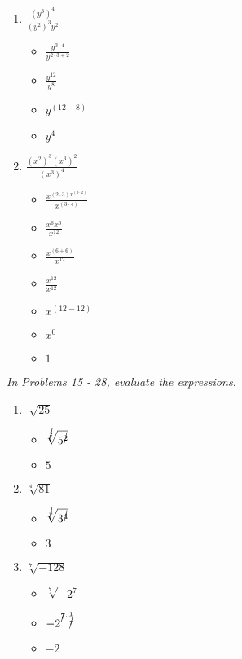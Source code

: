 \documentclass{article}
\begin{document}
\begin{onehalfspace}
\begin{enumerate}
        \item $\frac{(y^{3})^{4}}{(y^{2})^{3}y^{2}}$
        \begin{itemize}
            \item $\frac{y^{3 \cdot 4}}{y^{2 \cdot 3 + 2}}$
            \item $\frac{y^{12}}{y^{8}}$
            \item $y^{(12 - 8)}$
            \item $y^{4}$
        \end{itemize}
        
        \item $\frac{(x^{2})^{3}(x^{3})^{2}}{(x^{3})^{4}}$
        \begin{itemize}
            \item $\frac{x^{(2 \cdot 3)x^{(3 \cdot 2)}}}{x^{(3 \cdot 4)}}$
            \item $\frac{x^{6}x^{6}}{x^{12}}$
            \item $\frac{x^{(6 + 6)}}{x^{12}}$
            \item $\frac{x^{12}}{x^{12}}$
            \item $x^{(12 - 12)}$
            \item $x^{0}$
            \item $1$
        \end{itemize}
    \end{enumerate}

    \textit{In Problems 15 - 28, evaluate the expressions.}
    \begin{enumerate}[start=15]
        \item $\sqrt[]{25}$
        \begin{itemize}
            \item $\sqrt[\cancel{2}]{5^{\cancel{2}}}$
            \item $5$
        \end{itemize}

        \item $\sqrt[4]{81}$
        \begin{itemize}
            \item $\sqrt[\cancel{4}]{3^{\cancel{4}}}$
            \item $3$
        \end{itemize}

        \item $\sqrt[7]{-128}$
        \begin{itemize}
            \item $\sqrt[7]{-2^{7}}$
            \item $-2^{\cancel{7} \cdot \frac{1}{\cancel{7}}}$
            \item $-2$
        \end{itemize}


\end{enumerate}
\end{onehalfspace}
\end{document}

